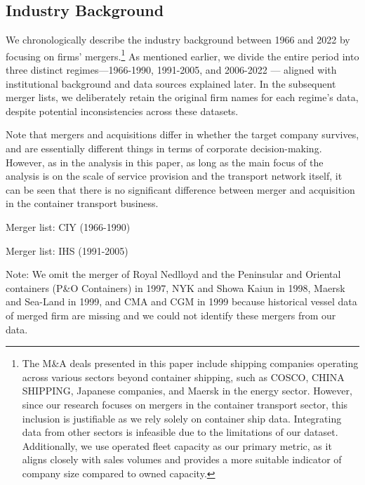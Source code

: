\documentclass[10pt]{article}
\begin{document}
\subsection{Industry Background}\label{sec:industry_background}
We chronologically describe the industry background between 1966 and 2022  by focusing on firms' mergers.\footnote{The M\&A deals presented in this paper include shipping companies operating across various sectors beyond container shipping, such as COSCO, CHINA SHIPPING, Japanese companies, and Maersk in the energy sector. However, since our research focuses on mergers in the container transport sector, this inclusion is justifiable as we rely solely on container ship data. Integrating data from other sectors is infeasible due to the limitations of our dataset. Additionally, we use operated fleet capacity as our primary metric, as it aligns closely with sales volumes and provides a more suitable indicator of company size compared to owned capacity.} 
As mentioned earlier, we divide the entire period into three distinct regimes—1966-1990, 1991-2005, and 2006-2022 — aligned with institutional background and data sources explained later.
In the subsequent merger lists, we deliberately retain the original firm names for each regime's data, despite potential inconsistencies across these datasets.

Note that mergers and acquisitions differ in whether the target company survives, and are essentially different things in terms of corporate decision-making. However, as in the analysis in this paper, as long as the main focus of the analysis is on the scale of service provision and the transport network itself, it can be seen that there is no significant difference between merger and acquisition in the container transport business.

\begin{table}[!htbp]
  \begin{center}
      \caption{Merger list: CIY (1966-1990)}
      \label{tb:merger_list_CIY} 
      
  \end{center}\footnotesize
\end{table} 

\begin{table}[!htbp]
  \begin{center}
      \caption{Merger list: IHS (1991-2005)}
      \label{tb:merger_list_IHS} 
      
  \end{center}\footnotesize
  Note: We omit the merger of Royal Nedlloyd and the Peninsular and Oriental containers (P\&O Containers) in 1997, NYK and Showa Kaiun in 1998, Maersk and Sea-Land in 1999, and CMA and CGM in 1999 because historical vessel data of merged firm are missing and we could not identify these mergers from our data.
\end{table} 
\end{document}
